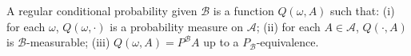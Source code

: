 A regular conditional probability given $\mathcal{B}$ is a function $Q(\omega, A)$ such that: (i) for each $\omega$, $Q(\omega, \cdot)$ is a probability measure on $\mathcal{A}$; (ii) for each $A \in \mathcal{A}$, $Q(\cdot, A)$ is $\mathcal{B}$-measurable; (iii) $Q(\omega, A) = P^{\mathcal{B}}A$ up to a $P_{\mathcal{B}}$-equivalence.
